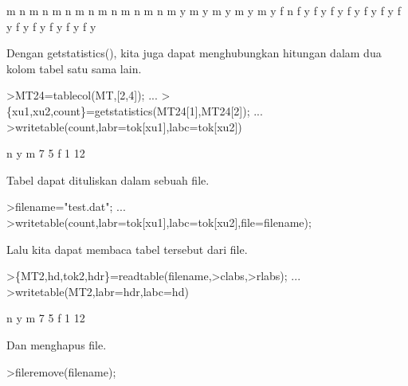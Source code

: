 \documentclass{article}
\begin{document}
\begin{eulernotebook}
\begin{euleroutput}
           m         n
           m         n
           m         n
           m         n
           m         n
           m         n
           m         n
           m         y
           m         y
           m         y
           m         y
           m         y
           f         n
           f         y
           f         y
           f         y
           f         y
           f         y
           f         y
           f         y
           f         y
           f         y
           f         y
           f         y
           f         y
\end{euleroutput}
\begin{eulercomment}
Dengan getstatistics(), kita juga dapat menghubungkan hitungan dalam
dua kolom tabel satu sama lain.
\end{eulercomment}
\begin{eulerprompt}
>MT24=tablecol(MT,[2,4]); ...
>\{xu1,xu2,count\}=getstatistics(MT24[1],MT24[2]); ...
>writetable(count,labr=tok[xu1],labc=tok[xu2])
\end{eulerprompt}
\begin{euleroutput}
                     n         y
           m         7         5
           f         1        12
\end{euleroutput}
\begin{eulercomment}
Tabel dapat dituliskan dalam sebuah file.
\end{eulercomment}
\begin{eulerprompt}
>filename="test.dat"; ...
>writetable(count,labr=tok[xu1],labc=tok[xu2],file=filename);
\end{eulerprompt}
\begin{eulercomment}
Lalu kita dapat membaca tabel tersebut dari file.
\end{eulercomment}
\begin{eulerprompt}
>\{MT2,hd,tok2,hdr\}=readtable(filename,>clabs,>rlabs); ...
>writetable(MT2,labr=hdr,labc=hd)
\end{eulerprompt}
\begin{euleroutput}
                     n         y
           m         7         5
           f         1        12
\end{euleroutput}
\begin{eulercomment}
Dan menghapus file.
\end{eulercomment}
\begin{eulerprompt}
>fileremove(filename);
\end{eulerprompt}
\begin{eulercomment}

\end{eulercomment}
\end{eulernotebook}
\end{document}
